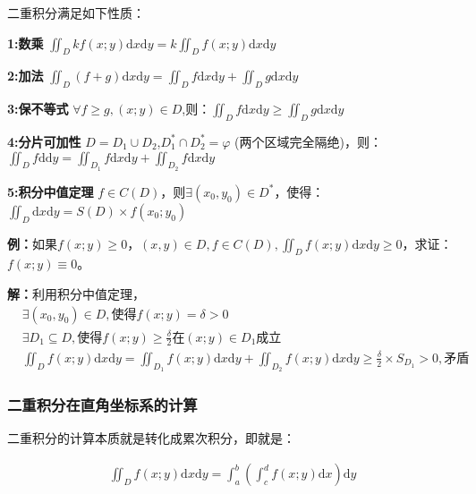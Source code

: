 \documentclass{ctexart}
\let\oldtextbf\textbf
\renewcommand{\textbf}[1]{\textcolor{brown!50!red}{\oldtextbf{#1}}}
\begin{document}
\begin{tcolorbox}[
    colback=bac1,     %
    colframe=fra1,   %
    coltitle=white,             %
    coltext=tex1,
    title=二重积分的性质,
    fonttitle=\bfseries,        %
arc=3mm,                     %
breakable
]
二重积分满足如下性质：

\textbf{\color{brown!50!red}1:数乘} $\iint_D kf(x;y)\mathrm{d}x\mathrm{d}y=k\iint_D f(x;y)\mathrm{d}x\mathrm{d}y$

\textbf{\color{brown!50!red}2:加法} $\iint_D(f+g)\mathrm{d}x\mathrm{d}y=\iint_D f\mathrm{d}x\mathrm{d}y+\iint_D g\mathrm{d}x\mathrm{d}y$

\textbf{\color{brown!50!red}3:保不等式} $\forall f\geq g,(x;y)\in D$,则：$\iint_D f\mathrm{d}x\mathrm{d}y\geq \iint_D g\mathrm{d}x\mathrm{d}y$

\textbf{\color{brown!50!red}4:分片可加性} $D=D_1\cup D_2$,$D_1^*\cap D_2^*=\varphi$ (两个区域完全隔绝)，则：$\iint_D f\mathrm{d}\mathrm{d}y=\iint_{D_1}f\mathrm{d}x\mathrm{d}y+\iint_{D_2}f\mathrm{d}x\mathrm{d}y$

\textbf{\color{brown!50!red}5:积分中值定理}  $f\in C(D)$，则$\exists (x_0,y_0)\in D^*$，使得：$\iint_D \mathrm{d}x\mathrm{d}y=S(D)\times f(x_0;y_0)$
\end{tcolorbox}



\textbf{\color{brown!50!red}例：}如果$f(x;y)\geq 0，(x,y)\in D,f\in C(D),\iint_D f(x;y)\mathrm{d}x\mathrm{d}y\geq 0$，求证：$f(x;y)\equiv 0$。

\textbf{\color{brown!50!red}解：}利用积分中值定理，
\begin{align*}
    &\exists (x_0,y_0)\in D,\text{使得}f(x;y)=\delta>0\\
    &\exists D_1\subseteq D,\text{使得}f(x;y)\geq \frac{\delta}{2}\text{在}(x;y)\in D_1\text{成立}\\
    &\iint_D f(x;y)\mathrm{d}x\mathrm{d}y=\iint_{D_1}f(x;y)\mathrm{d}x\mathrm{d}y+\iint_{D_2}f(x;y)\mathrm{d}x\mathrm{d}y\geq \frac{\delta}{2}\times S_{D_1}>0,\text{矛盾}
\end{align*}

\subsubsection{二重积分在直角坐标系的计算}

二重积分的计算本质就是转化成累次积分，即就是：
\begin{tcolorbox}[
    colback=bac2,     %
    colframe=fra2,   %
    coltitle=white,             %
    coltext=tex2,
    title=二重积分的计算方式,
    fonttitle=\bfseries,        %
    arc=3mm                     %
]
\begin{align*}
    \iint_D f(x;y)\mathrm{d}x\mathrm{d}y=\int_a^b(\int_c^d f(x;y)\mathrm{d}x)\mathrm{d}y\tag{1-2}
\end{align*}
\end{tcolorbox}
\end{document}
